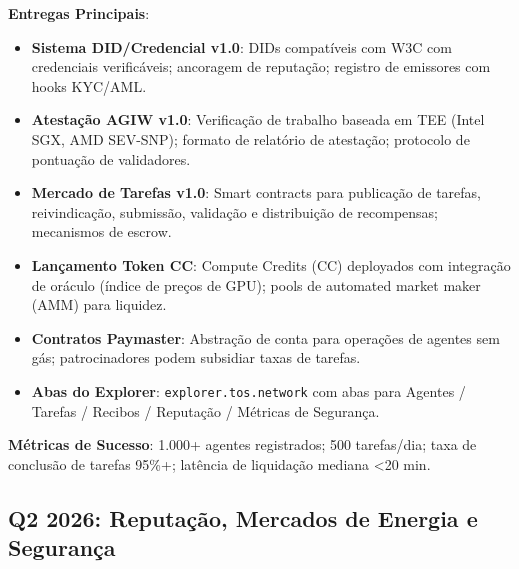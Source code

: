 \documentclass[11pt]{article}
\begin{document}
\begin{itemize}[noitemsep]
\begin{itemize}[noitemsep]
\begin{itemize}[noitemsep]
\textbf{Entregas Principais}:
\begin{itemize}[noitemsep]
  \item \textbf{Sistema DID/Credencial v1.0}: DIDs compatíveis com W3C com credenciais verificáveis; ancoragem de reputação; registro de emissores com hooks KYC/AML.
  \item \textbf{Atestação AGIW v1.0}: Verificação de trabalho baseada em TEE (Intel SGX, AMD SEV-SNP); formato de relatório de atestação; protocolo de pontuação de validadores.
  \item \textbf{Mercado de Tarefas v1.0}: Smart contracts para publicação de tarefas, reivindicação, submissão, validação e distribuição de recompensas; mecanismos de escrow.
  \item \textbf{Lançamento Token CC}: Compute Credits (CC) deployados com integração de oráculo (índice de preços de GPU); pools de automated market maker (AMM) para liquidez.
  \item \textbf{Contratos Paymaster}: Abstração de conta para operações de agentes sem gás; patrocinadores podem subsidiar taxas de tarefas.
  \item \textbf{Abas do Explorer}: \texttt{explorer.tos.network} com abas para Agentes / Tarefas / Recibos / Reputação / Métricas de Segurança.
\end{itemize}

\textbf{Métricas de Sucesso}: 1.000+ agentes registrados; 500 tarefas/dia; taxa de conclusão de tarefas 95\%+; latência de liquidação mediana <20 min.

\subsection{Q2 2026: Reputação, Mercados de Energia e Segurança}


\end{itemize}
\end{itemize}
\end{itemize}
\end{document}

